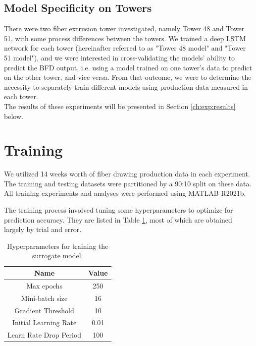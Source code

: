 \subsection{Model Specificity on Towers}

There were two fiber extrusion tower investigated, namely Tower 48 and Tower 51, with some process differences between the towers. We trained a deep LSTM network for each tower (hereinafter referred to as "Tower 48 model" and "Tower 51 model"), and we were interested in cross-validating the models' ability to predict the BFD output, i.e. using a model trained on one tower's data to predict on the other tower, and vice versa. From that outcome, we were to determine the necessity to separately train different models using production data measured in each tower. \\
\newline
The results of these experiments will be presented in Section \ref{ch:exp:results} below. 

\section{Training} \label{ch:exp:train}

We utilized 14 weeks worth of fiber drawing production data in each experiment. The training and testing datasets were partitioned by a 90:10 split on these data. All training experiments and analyses were performed using MATLAB R2021b. 

The training process involved tuning some hyperparameters to optimize for prediction accuracy. They are listed in Table \ref{tab:hyper_param}, most of which are obtained largely by trial and error. 


\begin{table}[b!]
    \centering
    \begin{tabular}{c c}
         Name & Value \\ \hline 
         Max epochs & 250\\ 
         Mini-batch size & 16\\ 
         Gradient Threshold & 10 \\ 
         Initial Learning Rate & 0.01 \\
         Learn Rate Drop Period & 100 \\ \hline
    \end{tabular}
    \caption{Hyperparameters for training the surrogate model.}
    \label{tab:hyper_param}
\end{table}

